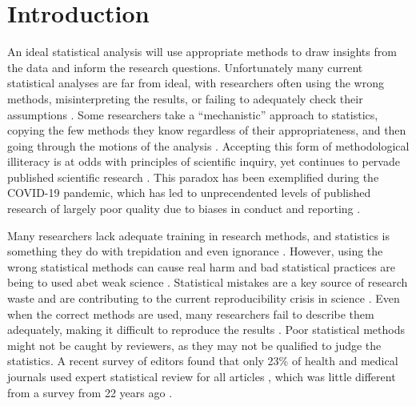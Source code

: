 \documentclass[12pt]{article}
\begin{document}
\newpage
{} %

\hypertarget{introduction}{%
\section{Introduction}\label{introduction}}

An ideal statistical analysis will use appropriate methods to draw
insights from the data and inform the research questions. Unfortunately
many current statistical analyses are far from ideal, with 
researchers often using the wrong methods, misinterpreting the results, or
failing to adequately check their assumptions \citep{2008, Leek2017}.
Some researchers take a ``mechanistic'' approach to statistics, copying
the few methods they know regardless of their appropriateness, and then
going through the motions of the analysis \citep{Stark2018}. Accepting this form of methodological illiteracy is at odds
with principles of scientific inquiry, yet continues to pervade published scientific research \citep{VanCalster2021}. 
This paradox has been exemplified during the COVID-19 pandemic, which has led to unprecendented levels of published research of largely 
poor quality due to biases in conduct and reporting \citep{Glasziou2020,Wynants2020}.

Many researchers lack adequate training in research methods, and
statistics is something they do with trepidation and even ignorance
\citep{Altman1994, King2019}. However, using the wrong statistical
methods can cause real harm \citep{Altman1994, Brown2018} and bad
statistical practices are being to used abet weak science
\citep{Stark2018}. Statistical mistakes are a key source of research waste and are contributing to 
the current reproducibility crisis in
science \citep{Allison2016}. Even when the correct methods are used,
many researchers fail to describe them adequately, making it difficult
to reproduce the results \citep{Ernst2017, Zhou2018}. Poor statistical
methods might not be caught by reviewers, as they may not be qualified
to judge the statistics. A recent survey of editors found that only 23\%
of health and medical journals used expert statistical review for all
articles \citep{Hardwicke2020}, which was little different from a survey
from 22 years ago \citep{Goodman1998}.
\end{document}
